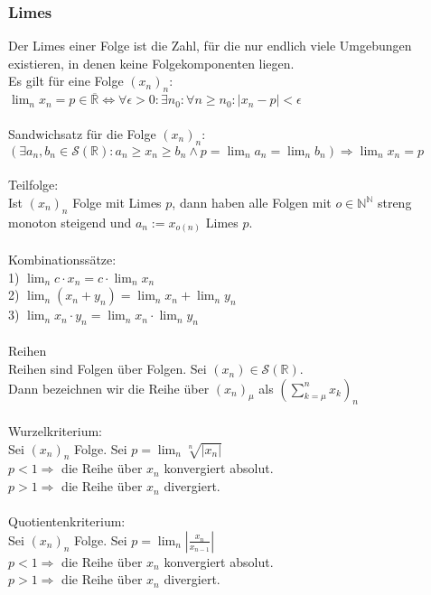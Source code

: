 \documentclass{article}
\begin{document}
\subsubsection*{Limes}
Der Limes einer Folge ist die Zahl, für die nur endlich viele Umgebungen existieren, in denen keine Folgekomponenten liegen.\\
Es gilt für eine Folge \((x_n)_n\):\\
\(\lim_n x_n = p \in \overline{\mathbb{R}} \Longleftrightarrow \forall \epsilon > 0: \exists n_0: \forall n \ge n_0: |x_n - p| < \epsilon\) \\ \\
Sandwichsatz für die Folge \((x_n)_n\):\\
\((\exists a_n, b_n \in \mathcal{S}(\mathbb R): a_n \ge x_n \ge b_n \wedge p = \lim_{n} a_n = \lim_{n} b_n) \Longrightarrow \lim_n x_n = p\) \\ \\
Teilfolge: \\
Ist \((x_n)_n\) Folge mit Limes \(p\), dann haben alle Folgen mit \(o \in \mathbb N ^ \mathbb N\) streng monoton steigend und \(a_n := x_{o(n)}\) Limes \(p\). \\ \\
Kombinationssätze:\\
1) \(\lim_n c \cdot x_n = c \cdot \lim_n x_n\) \\
2) \(\lim_n (x_n + y_n) = \lim_n x_n + \lim_n y_n\) \\
3) \(\lim_n x_n \cdot y_n = \lim_n x_n \cdot \lim_n y_n\) \\ \\
Reihen \\
Reihen sind Folgen über Folgen. Sei \((x_n) \in \mathcal{S}(\mathbb R)\).\\ Dann bezeichnen wir die Reihe über \((x_n)_\mu\) als \(\left(\sum_{k = \mu}^{n} x_k\right)_n\) \\ \\
Wurzelkriterium:\\
Sei \((x_n)_n\) Folge. Sei \(p = \lim_n \sqrt[n]{|x_n|}\) \\
\(p < 1 \Longrightarrow \) die Reihe über \(x_n\) konvergiert absolut. \\
\(p > 1 \Longrightarrow \) die Reihe über \(x_n\) divergiert. \\ \\
Quotientenkriterium:\\
Sei \((x_n)_n\) Folge. Sei \(p = \lim_{n}|\frac{x_n}{x_{n-1}}|\) \\
\(p < 1 \Longrightarrow \) die Reihe über \(x_n\) konvergiert absolut. \\
\(p > 1 \Longrightarrow \) die Reihe über \(x_n\) divergiert. 
\end{document}
